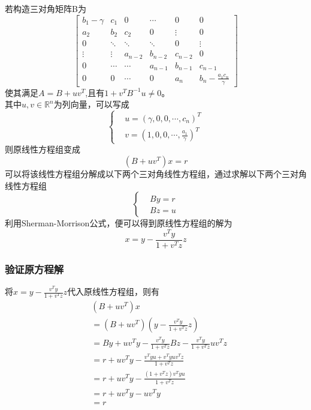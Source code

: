\documentclass[twoside,twocolumn]{article}
\begin{document}
\begin{CJK*}{UTF8}{gkai}
若构造三对角矩阵B为
\begin{equation*}
	\begin{bmatrix} 
		b_1-\gamma&c_1&0&\cdots&0&0\\
		a_2&b_2&c_2&0&\vdots&0\\
		0&\ddots&\ddots&\ddots&0&\vdots\\
		\vdots&\vdots&a_{n-2}&b_{n-2}&c_{n-2}&0\\
		0&\cdots&\cdots&a_{n-1}&b_{n-1}&c_{n-1}\\
		0&0&\cdots&0&a_n&b_n-\frac{a_1c_n}{\gamma}\end{bmatrix}
\end{equation*}
使其满足$A=B+uv^{T}$,且有$1+v^{T}B^{-1}u\neq 0$。\\
其中$u,v\in \mathbb{R}^{n}$为列向量，可以写成
\begin{equation*}
	\left\{
	\begin{aligned}
		&u=(\gamma,0,0,\cdots,c_{n})^{T}\\
		&v=(1,0,0,\cdots,\frac{a_{1}}{\gamma})^{T}
	\end{aligned}
	\right.
\end{equation*}
则原线性方程组变成
\begin{equation*}
	(B+uv^{T})x=r
\end{equation*}
可以将该线性方程组分解成以下两个三对角线性方程组，通过求解以下两个三对角线性方程组
\begin{equation*}
	\left\{
	\begin{aligned}
		&By=r\\
		&Bz=u
	\end{aligned}
	\right.
\end{equation*}
利用Sherman-Morrison公式，便可以得到原线性方程组的解为
\begin{equation*}
	x=y-\frac{v^{T}y}{1+v^{T}z}z
\end{equation*}
\subsubsection{验证原方程解}
将$x=y-\frac{v^{T}y}{1+v^{T}z}z$代入原线性方程组，则有
\begin{equation*}
	\begin{aligned}
		&(B+uv^{T})x\\
		&=(B+uv^{T})(y-\frac{v^{T}y}{1+v^{T}z}z)\\
		&=By+uv^{T}y-\frac{v^{T}y}{1+v^{T}z}Bz-\frac{v^{T}y}{1+v^{T}z}uv^{T}z\\
		&=r+uv^{T}y-\frac{v^{T}yu+v^{T}yuv^{T}z}{1+v^{T}z}\\
		&=r+uv^{T}y-\frac{(1+v^{T}z)v^{T}yu}{1+v^{T}z}\\
		&=r+uv^{T}y-uv^{T}y\\
		&=r
	\end{aligned}
\end{equation*}


\end{CJK*}
\end{document}
